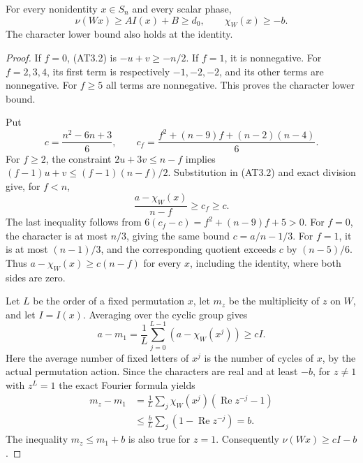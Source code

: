 \begin{lemma}[HD-AT301]
For every nonidentity $x\in S_n$ and every scalar phase,
\[
                 \nu(Wx)\ge A I(x)+B\ge d_0,
 \qquad \chi_W(x)\ge-b.                                \tag{AT3.3}
\]
The character lower bound also holds at the identity.
\end{lemma}

\begin{proof}
If $f=0$, (AT3.2) is $-u+v\ge-n/2$.  If $f=1$, it is
nonnegative.  For $f=2,3,4$, its first term is respectively
$-1,-2,-2$, and its other terms are nonnegative.  For $f\ge5$
all terms are nonnegative.  This proves the character lower bound.

Put
\[
 c=\frac{n^2-6n+3}6,\qquad
 c_f=\frac{f^2+(n-9)f+(n-2)(n-4)}6.                     \tag{AT3.4}
\]
For $f\ge2$, the constraint $2u+3v\le n-f$ implies
$(f-1)u+v\le(f-1)(n-f)/2$.  Substitution in (AT3.2)
and exact division give, for $f<n$,
\[
             \frac{a-\chi_W(x)}{n-f}\ge c_f\ge c.
                                                                  \tag{AT3.5}
\]
The last inequality follows from
$6(c_f-c)=f^2+(n-9)f+5>0$.
For $f=0$, the character is at most $n/3$, giving the same
bound $c=a/n-1/3$.  For $f=1$, it is at most $(n-1)/3$,
and the corresponding quotient exceeds $c$ by $(n-5)/6$.
Thus $a-\chi_W(x)\ge c(n-f)$ for every $x$, including the
identity, where both sides are zero.

Let $L$ be the order of a fixed permutation $x$, let $m_z$
be the multiplicity of $z$ on $W$, and let $I=I(x)$.
Averaging over the cyclic group gives
\[
 a-m_1=\frac1L\sum_{j=0}^{L-1}(a-\chi_W(x^j))\ge cI.
                                                                  \tag{AT3.6}
\]
Here the average number of fixed letters of $x^j$ is the
number of cycles of $x$, by the actual permutation action.
Since the characters are real and at least $-b$, for $z\ne1$
with $z^L=1$ the exact Fourier formula yields
\[
 \begin{split}
 m_z-m_1
 &=\frac1L\sum_j\chi_W(x^j)(\operatorname{Re}z^{-j}-1)\\
 &\le\frac bL\sum_j(1-\operatorname{Re}z^{-j})=b.
 \end{split}                                                   \tag{AT3.7}
\]
The inequality $m_z\le m_1+b$ is also true for $z=1$.
Consequently $\nu(Wx)\ge cI-b$.


\end{proof}
